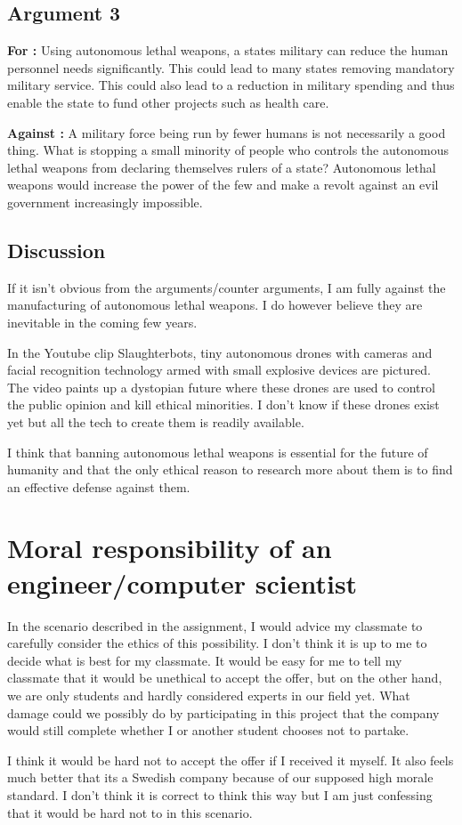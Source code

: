 \documentclass[11pt, a4paper]{article}
\begin{document}
\subsection{Argument 3}
\textbf{For :} Using autonomous lethal weapons, a states military can reduce the human personnel needs significantly. This could lead to many
states removing mandatory military service. This could also lead to a reduction in military spending and thus enable the state to
fund other projects such as health care.

\vspace{2mm}\noindent\textbf{Against :} A military force being run by fewer humans is not necessarily a good thing. What is stopping a
small minority of people who controls the autonomous lethal weapons from declaring themselves rulers of a state? Autonomous lethal weapons
would increase the power of the few and make a revolt against an evil government increasingly impossible.

\subsection{Discussion}
If it isn't obvious from the arguments/counter arguments, I am fully against the manufacturing of autonomous lethal weapons.
I do however believe they are inevitable in the coming few years. 

In the Youtube clip Slaughterbots\cite{slaughterbots},
tiny autonomous drones with cameras and facial recognition technology armed with small explosive devices are pictured.
The video paints up a dystopian future where these drones are used to control the public opinion and kill ethical minorities.
I don't know if these drones exist yet but all the tech to create them is readily available.

I think that banning autonomous lethal weapons is essential for the future of humanity and that the only ethical reason to research more about
them is to find an effective defense against them.

\section{Moral responsibility of an engineer/computer scientist}
In the scenario described in the assignment, I would advice my classmate to carefully consider the ethics of this possibility. I don't
think it is up to me to decide what is best for my classmate. It would be easy for me to tell my classmate that it would be unethical to
accept the offer, but on the other hand, we are only students and hardly considered experts in our field yet. What damage could we possibly
do by participating in this project that the company would still complete whether I or another student chooses not to partake. 

I think it
would be hard not to accept the offer if I received it myself. It also feels much better that its a Swedish company because of our supposed
high morale standard. I don't think it is correct to think this way but I am just confessing that it would be hard not to in this scenario.



\end{document}
